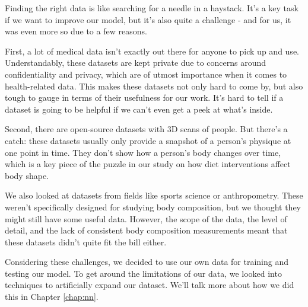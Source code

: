 Finding the right data is like searching for a needle in a haystack. It's a key
task if we want to improve our model, but it's also quite a challenge - and for
us, it was even more so due to a few reasons.

First, a lot of medical data isn't exactly out there for anyone to pick up and
use. Understandably, these datasets are kept private due to concerns around
confidentiality and privacy, which are of utmost importance when it comes to
health-related data. This makes these datasets not only hard to come by, but
also tough to gauge in terms of their usefulness for our work. It's hard to
tell if a dataset is going to be helpful if we can't even get a peek at what's
inside.

Second, there are open-source datasets with 3D scans of people. But there's a
catch: these datasets usually only provide a snapshot of a person's physique at
one point in time. They don't show how a person's body changes over time, which
is a key piece of the puzzle in our study on how diet interventions affect body
shape.

We also looked at datasets from fields like sports science or anthropometry.
These weren't specifically designed for studying body composition, but we
thought they might still have some useful data. However, the scope of the data,
the level of detail, and the lack of consistent body composition measurements
meant that these datasets didn't quite fit the bill either.

Considering these challenges, we decided to use our own data for training and
testing our model. To get around the limitations of our data, we looked into
techniques to artificially expand our dataset. We'll talk more about how we did
this in Chapter \ref{chap:nn}.